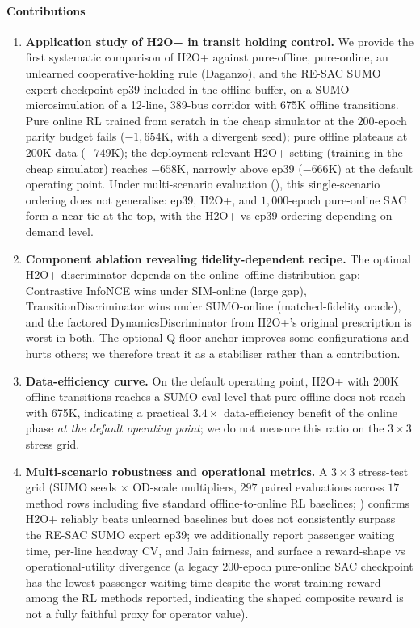 \paragraph{Contributions}
\begin{enumerate}
    \item \textbf{Application study of H2O+ in transit holding control.} We provide the first systematic comparison of H2O+ against pure-offline, pure-online, an unlearned cooperative-holding rule (Daganzo), and the RE-SAC SUMO expert checkpoint ep39 included in the offline buffer, on a SUMO microsimulation of a 12-line, 389-bus corridor with 675K offline transitions. Pure online RL trained from scratch in the cheap simulator at the $200$-epoch parity budget fails ($-1{,}654$K, with a divergent seed); pure offline plateaus at 200K data ($-749$K); the deployment-relevant H2O+ setting (training in the cheap simulator) reaches $-658$K, narrowly above ep39 ($-666$K) at the default operating point. Under multi-scenario evaluation (), this single-scenario ordering does not generalise: ep39, H2O+, and $1{,}000$-epoch pure-online SAC form a near-tie at the top, with the H2O+ vs ep39 ordering depending on demand level.
    \item \textbf{Component ablation revealing fidelity-dependent recipe.} The optimal H2O+ discriminator depends on the online--offline distribution gap: Contrastive InfoNCE wins under SIM-online (large gap), TransitionDiscriminator wins under SUMO-online (matched-fidelity oracle), and the factored DynamicsDiscriminator from H2O+'s original prescription is worst in both. The optional Q-floor anchor improves some configurations and hurts others; we therefore treat it as a stabiliser rather than a contribution.
    \item \textbf{Data-efficiency curve.} On the default operating point, H2O+ with 200K offline transitions reaches a SUMO-eval level that pure offline does not reach with 675K, indicating a practical $3.4\times$ data-efficiency benefit of the online phase \emph{at the default operating point}; we do not measure this ratio on the $3 \times 3$ stress grid.
    \item \textbf{Multi-scenario robustness and operational metrics.} A $3 \times 3$ stress-test grid (SUMO seeds $\times$ OD-scale multipliers, $297$ paired evaluations across $17$ method rows including five standard offline-to-online RL baselines; ) confirms H2O+ reliably beats unlearned baselines but does not consistently surpass the RE-SAC SUMO expert ep39; we additionally report passenger waiting time, per-line headway CV, and Jain fairness, and surface a reward-shape vs operational-utility divergence (a legacy $200$-epoch pure-online SAC checkpoint has the lowest passenger waiting time despite the worst training reward among the RL methods reported, indicating the shaped composite reward is not a fully faithful proxy for operator value).

\end{enumerate}
